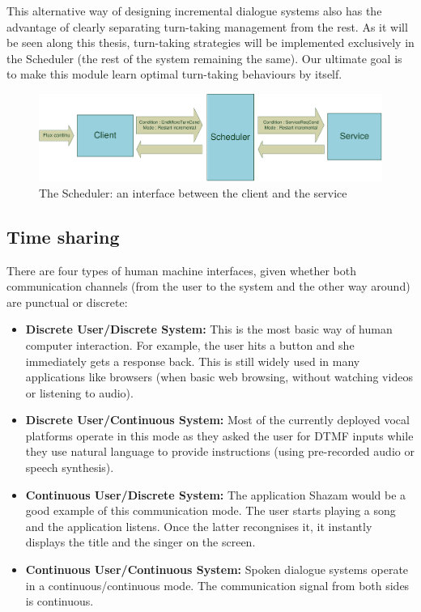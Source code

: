         This alternative way of designing incremental dialogue systems also has the advantage of clearly separating turn-taking management from the rest. As it will be seen along this thesis, turn-taking strategies will be implemented exclusively in the Scheduler (the rest of the system remaining the same). Our ultimate goal is to make this module learn optimal turn-taking behaviours by itself.
        
     	\begin{figure}[t]
          \centering
          \includegraphics[scale=0.7]{figures/ClientSchedService.pdf}
          \caption{The Scheduler: an interface between the client and the service}
          \label{fig:archioverview}
        \end{figure}
        
    \subsection{Time sharing}
    
    	There are four types of human machine interfaces, given whether both communication channels (from the user to the system and the other way around) are punctual or discrete:
        
        \begin{itemize}
        	\item \textbf{Discrete User/Discrete System:} This is the most basic way of human computer interaction. For example, the user hits a button and she immediately gets a response back. This is still widely used in many applications like browsers (when basic web browsing, without watching videos or listening to audio).
            \item \textbf{Discrete User/Continuous System:} Most of the currently deployed vocal platforms operate in this mode as they asked the user for DTMF inputs while they use natural language to provide instructions (using pre-recorded audio or speech synthesis).
           	\item \textbf{Continuous User/Discrete System:} The application Shazam would be a good example of this communication mode. The user starts playing a song and the application listens. Once the latter recongnises it, it instantly displays the title and the singer on the screen.
            \item \textbf{Continuous User/Continuous System:} Spoken dialogue systems operate in a continuous/continuous mode. The communication signal from both sides is continuous.
        \end{itemize}
        
